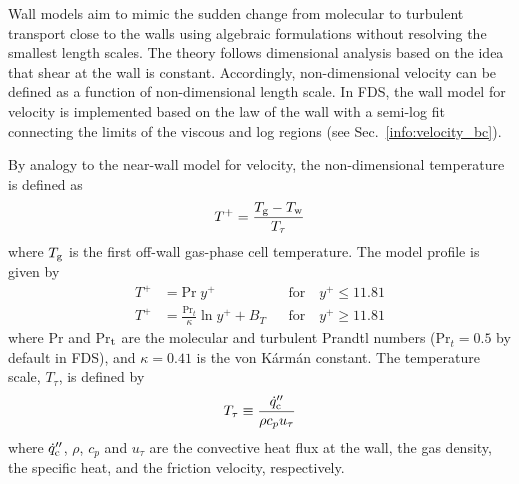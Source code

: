 Wall models aim to mimic the sudden change from molecular to turbulent transport close to the walls using algebraic formulations without resolving the smallest length scales. The theory follows dimensional analysis based on the idea that shear at the wall is constant. Accordingly, non-dimensional velocity can be defined as a function of non-dimensional length scale. In FDS, the wall model for velocity is implemented based on the law of the wall with a semi-log fit connecting the limits of the viscous and log regions (see Sec.~\ref{info:velocity_bc}).

By analogy to the near-wall model for velocity, the non-dimensional temperature is defined as
\begin{equation}
T^+ = \frac{T_{\rm g} - T_{\rm w}}{T_\tau}
\end{equation}
where $T_{\rm g}$ is the first off-wall gas-phase cell temperature.  The model profile is given by
\begin{align}
\label{eqn_t_visclayer} T^+ &= \mbox{Pr}\;y^+                            && \mbox{for} \quad y^+ \le 11.81 \\
\label{eqn_t_loglaw}    T^+ &= \frac{\mbox{Pr}_t}{\kappa} \ln y^+ + B_T  && \mbox{for} \quad y^+ \ge 11.81
\end{align}
where Pr and Pr$_{\rm t}$ are the molecular and turbulent Prandtl numbers  (Pr$_t=0.5$ by default in FDS), and $\kappa = 0.41$ is the von K\'arm\'an constant.  The temperature scale, $T_{\tau}$, is defined by
\begin{equation}
\label{eqn_friction_temperature}
T_{\tau} \equiv \frac{\dot{q}_{\rm c}''}{{\rho}{c_p}{u_{\tau}}}
\end{equation}
where $\dot{q}_{\rm c}''$, $\rho$, $c_p$ and $u_{\tau}$  are the convective heat flux at the wall, the gas density, the specific heat, and the friction velocity, respectively.

